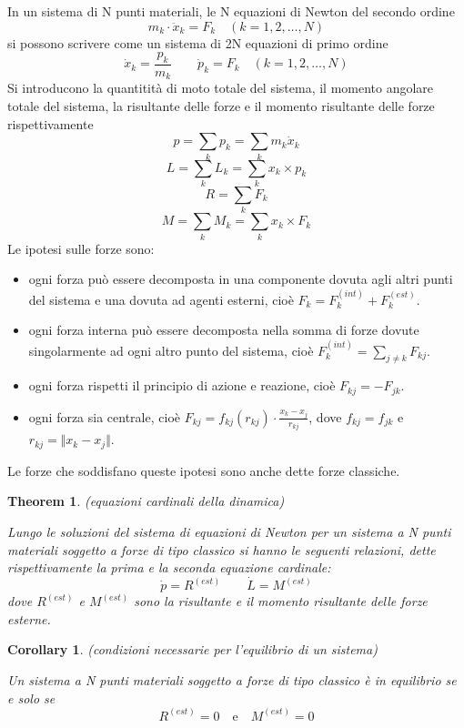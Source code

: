 \documentclass{article}
\newtheorem{theorem}{Theorem}[section]
\newtheorem{corollary}{Corollary}[theorem]
\begin{document}
            In un sistema di N punti materiali, le N equazioni di Newton del secondo ordine \[ m_k \cdot \ddot{x}_k = F_k \quad (k = 1, 2, \dots, N) \] si possono scrivere come
            un sistema di 2N equazioni di primo ordine \[ \dot{x}_k = \frac{p_k}{m_k} \quad \quad \dot{p}_k = F_k \quad (k = 1, 2, \dots, N) \]
            Si introducono la quantitità di moto totale del sistema, il momento angolare totale del sistema, la risultante delle forze e il momento risultante delle forze
            rispettivamente \[ p = \sum_k p_k = \sum_k m_k \dot{x}_k \] \[ L = \sum_k L_k = \sum_k x_k \times p_k \] \[ R = \sum_k F_k \] \[ M =  \sum_k M_k = \sum_k x_k \times F_k \]
            Le ipotesi sulle forze sono:
            \begin{itemize} 
                \item ogni forza può essere decomposta in una componente dovuta agli altri punti del sistema e una dovuta ad agenti esterni, cioè $F_k = F_k^{(int)} + F_k^{(est)}$.
                \item ogni forza interna può essere decomposta nella somma di forze dovute singolarmente ad ogni altro punto del sistema, cioè $F_k^{(int)} = \sum_{j \neq k} F_{kj}$.
                \item ogni forza rispetti il principio di azione e reazione, cioè $F_{kj} = - F_{jk}$.
                \item ogni forza sia centrale, cioè $F_{kj} = f_{kj}(r_{kj}) \cdot \frac{x_k - x_j}{r_{kj}}$, dove $f_{kj} = f_{jk}$ e $r_{kj} = \Vert x_k - x_j \Vert$.
            \end{itemize}
            Le forze che soddisfano queste ipotesi sono anche dette forze classiche.

            \begin{theorem}(equazioni cardinali della dinamica)
                \label{thm:equazioni cardinali}

                Lungo le soluzioni del sistema di equazioni di Newton per un sistema a N punti materiali soggetto a forze di tipo classico si hanno le seguenti relazioni,
                dette rispettivamente la prima e la seconda equazione cardinale: \[ \dot{p} = R^{(est)} \quad \quad \dot{L} = M^{(est)} \]
                dove $R^{(est)}$ e $M^{(est)}$ sono la risultante e il momento risultante delle forze esterne.

            \end{theorem}
            \begin{corollary}(condizioni necessarie per l'equilibrio di un sistema)
                \label{cor:equilibrio di un sistema}

                Un sistema a N punti materiali soggetto a forze di tipo classico è in equilibrio se e solo se \[ R^{(est)} = 0 \quad \text{e} \quad M^{(est)} = 0 \]

            \end{corollary}
\end{document}
